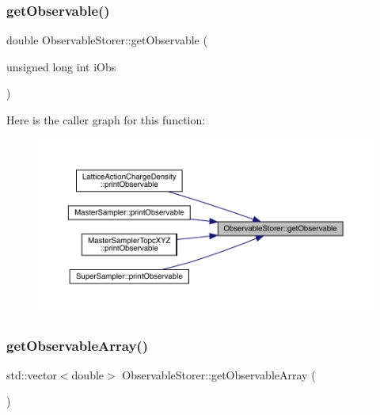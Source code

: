 \subsubsection{\texorpdfstring{getObservable()}{getObservable()}}
{\footnotesize\ttfamily double Observable\+Storer\+::get\+Observable (\begin{DoxyParamCaption}\item[{unsigned long int}]{i\+Obs }\end{DoxyParamCaption})\hspace{0.3cm}{\ttfamily [inline]}}

Here is the caller graph for this function\+:\nopagebreak
\begin{figure}[H]
\begin{center}
\leavevmode
\includegraphics[width=350pt]{class_observable_storer_af03e1c58c3e0efff251ef9b65cc8d152_icgraph}
\end{center}
\end{figure}
\mbox{\label{class_observable_storer_ab8885ce7eb3baa3fdb39cda767be6c83}} 
\subsubsection{\texorpdfstring{getObservableArray()}{getObservableArray()}}
{\footnotesize\ttfamily std\+::vector$<$double$>$ Observable\+Storer\+::get\+Observable\+Array (\begin{DoxyParamCaption}{ }\end{DoxyParamCaption})\hspace{0.3cm}{\ttfamily [inline]}}

